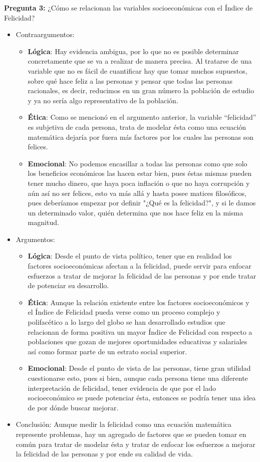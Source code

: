 \newpage
\textbf{Pregunta 3:} ¿Cómo se relacionan las variables socioeconómicas con el Índice de Felicidad?
\begin{itemize}
    \item Contraargumentos:
    \begin{itemize}
        \item \textbf{Lógica}: Hay evidencia ambigua, por lo que no es posible determinar concretamente que se va a realizar de manera precisa. Al tratarse de una variable que no es fácil de cuantificar hay que tomar muchos supuestos, sobre qué hace feliz a las personas y pensar que todas las personas racionales, es decir, reducimos en un gran número la población de estudio y ya no sería algo representativo de la población.
        \item \textbf{Ética}: Como se mencionó en el argumento anterior, la variable ``felicidad'' es subjetiva de cada persona, trata de modelar ésta como una ecuación matemática dejaría por fuera más factores por los cuales las personas son felices. 
        \item \textbf{Emocional}: No podemos encasillar a todas las personas como que solo los beneficios económicos las hacen estar bien, pues éstas mismas pueden tener mucho dinero, que haya poca inflación o que no haya corrupción y aún así no ser felices, esto va más allá y hasta posee matices filosóficos, pues deberíamos empezar por definir "¿Qué es la felicidad?", y si le damos un determinado valor, quién determina que nos hace feliz en la misma magnitud.
    \end{itemize}
    \item Argumentos:
    \begin{itemize}
        \item \textbf{Lógica}: Desde el punto de vista político, tener que en realidad los factores socioeconómicas afectan a la felicidad, puede servir para enfocar esfuerzos a tratar de mejorar la felicidad de las personas y por ende tratar de potenciar su desarrollo. 
        \item \textbf{Ética}: Aunque la relación existente entre los factores socioeconómicos y el Índice de Felicidad pueda verse como un proceso complejo y  polifacético a lo largo del globo se han desarrollado estudios que relacionan de forma positiva un mayor Índice de Felicidad con respecto a poblaciones que gozan de mejores oportunidades educativas y salariales así como formar parte de un estrato social superior. 
        \item \textbf{Emocional}: Desde el punto de vista de las personas, tiene gran utilidad cuestionarse esto, pues si bien, aunque cada persona tiene una diferente interpretación de felicidad, tener evidencia de que por el lado socioeconómico se puede potenciar ésta, entonces se podría tener una idea de por dónde buscar mejorar.
    \end{itemize}
    \item Conclusión: Aunque medir la felicidad como una ecuación matemática represente problemas, hay un agregado de factores que se pueden tomar en común para tratar de modelar ésta y tratar de enfocar los esfuerzos a mejorar la felicidad de las personas y por ende su calidad de vida.
\end{itemize}

